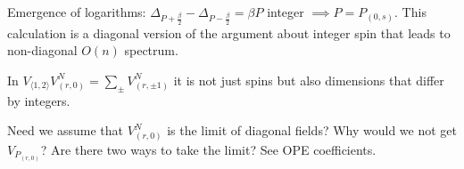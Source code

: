 \documentclass[12pt, a4paper]{article}
\theoremstyle{break}
\begin{document}
Emergence of logarithms: $\Delta_{P+\frac{\beta}{2}}-\Delta_{P-\frac{\beta}{2}} = \beta P$ integer $\implies P=P_{(0,s)}$. This calculation is a diagonal version of the argument about integer spin that leads to non-diagonal $O(n)$ spectrum.

In $V_{\langle 1,2\rangle}V^N_{(r,0)} = \sum_\pm V^N_{(r,\pm 1)}$ it is not just spins but also dimensions that differ by integers. 

Need we assume that $V^N_{(r,0)}$ is the limit of diagonal fields? Why would we not get $V_{P_{(r,0)}}$? Are there two ways to take the limit? See OPE coefficients. 




%
\end{document}
